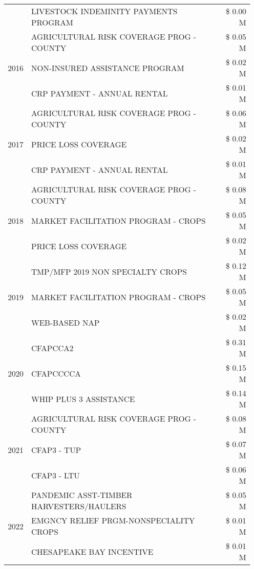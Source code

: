 \begin{tabular}{llr}
 & LIVESTOCK INDEMINITY PAYMENTS PROGRAM & \$ 0.00 M \\
\cline{1-3}
\multirow[t]{3}{*}{2016} & AGRICULTURAL RISK COVERAGE PROG - COUNTY & \$ 0.05 M \\
 & NON-INSURED ASSISTANCE PROGRAM & \$ 0.02 M \\
 & CRP PAYMENT - ANNUAL RENTAL & \$ 0.01 M \\
\cline{1-3}
\multirow[t]{3}{*}{2017} & AGRICULTURAL RISK COVERAGE PROG - COUNTY & \$ 0.06 M \\
 & PRICE LOSS COVERAGE & \$ 0.02 M \\
 & CRP PAYMENT - ANNUAL RENTAL & \$ 0.01 M \\
\cline{1-3}
\multirow[t]{3}{*}{2018} & AGRICULTURAL RISK COVERAGE PROG - COUNTY & \$ 0.08 M \\
 & MARKET FACILITATION PROGRAM - CROPS & \$ 0.05 M \\
 & PRICE LOSS COVERAGE & \$ 0.02 M \\
\cline{1-3}
\multirow[t]{3}{*}{2019} & TMP/MFP 2019 NON SPECIALTY CROPS & \$ 0.12 M \\
 & MARKET FACILITATION PROGRAM - CROPS & \$ 0.05 M \\
 & WEB-BASED NAP & \$ 0.02 M \\
\cline{1-3}
\multirow[t]{3}{*}{2020} & CFAPCCA2 & \$ 0.31 M \\
 & CFAPCCCCA & \$ 0.15 M \\
 & WHIP PLUS 3 ASSISTANCE & \$ 0.14 M \\
\cline{1-3}
\multirow[t]{3}{*}{2021} & AGRICULTURAL RISK COVERAGE PROG - COUNTY & \$ 0.08 M \\
 & CFAP3 - TUP & \$ 0.07 M \\
 & CFAP3 - LTU & \$ 0.06 M \\
\cline{1-3}
\multirow[t]{3}{*}{2022} & PANDEMIC ASST-TIMBER HARVESTERS/HAULERS & \$ 0.05 M \\
 & EMGNCY RELIEF PRGM-NONSPECIALITY CROPS & \$ 0.01 M \\
 & CHESAPEAKE BAY INCENTIVE & \$ 0.01 M \\
\cline{1-3}
\bottomrule
\end{tabular}
